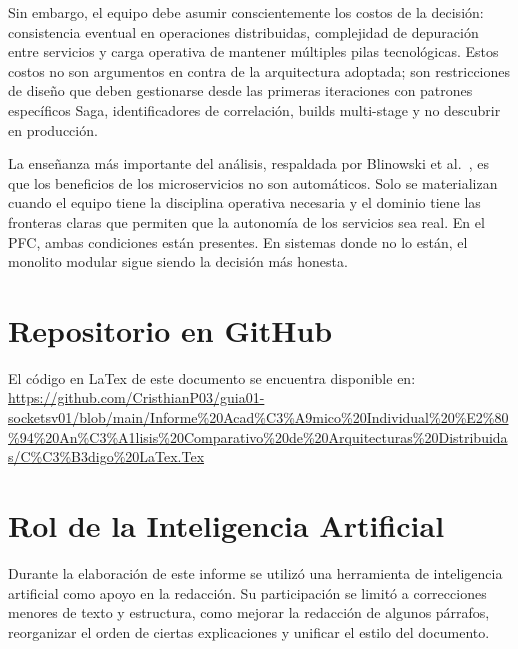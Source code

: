 \documentclass[12pt, a4paper]{article}
\begin{document}
Sin embargo, el equipo debe asumir conscientemente los costos de la decisión:
consistencia eventual en operaciones distribuidas, complejidad de depuración entre
servicios y carga operativa de mantener múltiples pilas tecnológicas. Estos costos
no son argumentos en contra de la arquitectura adoptada; son restricciones de diseño
que deben gestionarse desde las primeras iteraciones con patrones específicos Saga,
identificadores de correlación, builds multi-stage y no descubrir en producción.

La enseñanza más importante del análisis, respaldada por Blinowski
et al.~\cite{blinowski2022}, es que los beneficios de los microservicios no son
automáticos. Solo se materializan cuando el equipo tiene la disciplina operativa
necesaria y el dominio tiene las fronteras claras que permiten que la autonomía de
los servicios sea real. En el PFC, ambas condiciones están presentes. En sistemas
donde no lo están, el monolito modular sigue siendo la decisión más honesta.


\section*{Repositorio en GitHub}

El código en LaTex de este documento se encuentra disponible en:
\newline
\url{https://github.com/CristhianP03/guia01-socketsv01/blob/main/Informe%20Acad%C3%A9mico%20Individual%20%E2%80%94%20An%C3%A1lisis%20Comparativo%20de%20Arquitecturas%20Distribuidas/C%C3%B3digo%20LaTex.Tex}

\section*{Rol de la Inteligencia Artificial}
Durante la elaboración de este informe se utilizó una herramienta de
inteligencia artificial como apoyo en la redacción. Su participación se limitó
a correcciones menores de texto y estructura, como mejorar la redacción de
algunos párrafos, reorganizar el orden de ciertas explicaciones y unificar
el estilo del documento.

\clearpage

\printbibliography[title={Referencias bibliográficas}]
\end{document}
